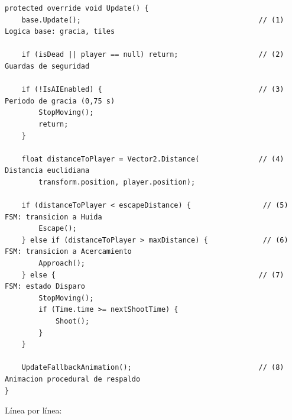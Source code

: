 \begin{lstlisting}
protected override void Update() {
    base.Update();                                          // (1) Logica base: gracia, tiles
    
    if (isDead || player == null) return;                   // (2) Guardas de seguridad
    
    if (!IsAIEnabled) {                                     // (3) Periodo de gracia (0,75 s)
        StopMoving();
        return;
    }
    
    float distanceToPlayer = Vector2.Distance(              // (4) Distancia euclidiana
        transform.position, player.position);
    
    if (distanceToPlayer < escapeDistance) {                 // (5) FSM: transicion a Huida
        Escape();
    } else if (distanceToPlayer > maxDistance) {             // (6) FSM: transicion a Acercamiento
        Approach();
    } else {                                                // (7) FSM: estado Disparo
        StopMoving();
        if (Time.time >= nextShootTime) {
            Shoot();
        }
    }
    
    UpdateFallbackAnimation();                              // (8) Animacion procedural de respaldo
}
\end{lstlisting}


Línea por línea:

